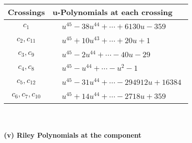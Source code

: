 \documentclass[1p]{elsarticle_modified}
\theoremstyle{definition}
\begin{document}
\begin{tabular}{m{50pt}|m{274pt}}
Crossings & \hspace{64pt}u-Polynomials at each crossing \\
\hline $$\begin{aligned}c_{1}\end{aligned}$$&$\begin{aligned}
&u^{45}-38 u^{44}+\cdots+6130 u-359
\end{aligned}$\\
\hline $$\begin{aligned}c_{2},c_{11}\end{aligned}$$&$\begin{aligned}
&u^{45}+10 u^{43}+\cdots+20 u+1
\end{aligned}$\\
\hline $$\begin{aligned}c_{3},c_{9}\end{aligned}$$&$\begin{aligned}
&u^{45}-2 u^{44}+\cdots-40 u-29
\end{aligned}$\\
\hline $$\begin{aligned}c_{4},c_{8}\end{aligned}$$&$\begin{aligned}
&u^{45}- u^{44}+\cdots- u^2-1
\end{aligned}$\\
\hline $$\begin{aligned}c_{5},c_{12}\end{aligned}$$&$\begin{aligned}
&u^{45}-31 u^{44}+\cdots-294912 u+16384
\end{aligned}$\\
\hline $$\begin{aligned}c_{6},c_{7},c_{10}\end{aligned}$$&$\begin{aligned}
&u^{45}+14 u^{44}+\cdots-2718 u+359
\end{aligned}$\\
\hline
\end{tabular}\\~\\
\newpage\renewcommand{\arraystretch}{1}
\flushleft \textbf{(v) Riley Polynomials at the component}\newline \\
\end{document}
